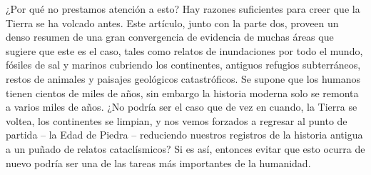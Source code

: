 \documentclass[10pt,twocolumn,letterpaper]{article}
\begin{document}
¿Por qué no prestamos atención a esto? Hay razones suficientes para creer que la Tierra se ha volcado antes. Este artículo, junto con la parte dos, proveen un denso resumen de una gran convergencia de evidencia de muchas áreas que sugiere que este es el caso, tales como relatos de inundaciones por todo el mundo, fósiles de sal y marinos cubriendo los continentes, antiguos refugios subterráneos, restos de animales y paisajes geológicos catastróficos. Se supone que los humanos tienen cientos de miles de años, sin embargo la historia moderna solo se remonta a varios miles de años. ¿No podría ser el caso que de vez en cuando, la Tierra se voltea, los continentes se limpian, y nos vemos forzados a regresar al punto de partida – la Edad de Piedra – reduciendo nuestros registros de la historia antigua a un puñado de relatos cataclísmicos? Si es así, entonces evitar que esto ocurra de nuevo podría ser una de las tareas más importantes de la humanidad.
\end{document}
